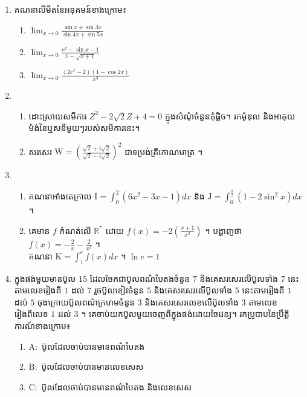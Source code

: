 \documentclass{officialexam}
\begin{document}
	{\maketitle}
	\begin{enumerate}[I]
		\item គណនាលីមីតនៃអនុគមន៍ខាងក្រោម៖
		\begin{enumerate}[k,3]
			\item $\lim_{x\to0}\frac{\sin x+\sin3x}{\sin4x+\sin5x}$
			\item $\lim_{x\to0}\frac{e^x-\sin x-1}{1-\sqrt{x+1}}$
			\item $\lim_{x\to0}\frac{(2e^x-2)(1-\cos2x)}{x^3}$
		\end{enumerate}
		\item\begin{enumerate}[k]
			\item ដោះស្រាយសមីការ $Z^2-2\sqrt{2}Z+4=0$ ក្នុងសំណុំចំនួនកុំផ្លិច។ រកម៉ូឌុល និងអាគុយម៉ង់នៃឬសនីមួយៗរបស់សមីការនេះ។
			\item សរសេរ $\mathrm{W}=\left(\frac{\sqrt{2}+i\sqrt{2}}{\sqrt{2}-i\sqrt{2}}\right)^2$ ជាទម្រង់ត្រីកោណមាត្រ ។
		\end{enumerate}
		\item \begin{enumerate}[k]
			\item គណនាអាំងតេក្រាល $\mathrm{I}=\int_0^2\left(6x^2-3x-1\right)dx$ និង $\mathrm{J}=\int_{0}^{\frac{\pi}{2}}\left(1-2\sin^2x\right)dx$ ។
			\item គេមាន $f$ កំណត់លើ $\mathbb{R^*}$ ដោយ $f(x)=-2\left(\frac{x+1}{x^2}\right)$ ។ បង្ហាញថា $f(x)=-\frac{2}{x}-\frac{2}{x^2}$ ។\\
			គណនា $\mathrm{K}=\int_{1}^{e}f(x)dx$ ។ $\ln e=1$
		\end{enumerate}
		\item ក្នុងផង់មួយមានប៊ូល $15$ ដែលចែកជាប៊ូលពណ៌បៃតងចំនួន $7$ និងគេសរសេរលើប៊ូលទាំង $7$ នេះតាមលេខរៀងពី $1$ ដល់ $7$ រួចប៊ូលខៀវចំនួន $5$ និងគេសរសេរលើប៊ូលទាំង $5$ នេះតាមរៀងពី $1$ ដល់ $5$ ចុងក្រោយប៊ូលពណ៌ក្រហមចំនួន $3$ និងគេសរសេរលេខលើប៊ូលទាំង $3$ តាមលេខរៀងពីលេខ $1$ ដល់ $3$ ។ គេចាប់យកប៊ូលមួយចេញពីក្នុងផង់ដោយចៃដន្យ។ រកប្រូបាបនៃប្រឹត្តិការណ៍ខាងក្រោម៖ 
		\begin{enumerate}[k]
			\item $\mathrm{A}:$ ប៊ូលដែលចាប់បានមានពណ៌បៃតង
			\item $\mathrm{B}:$ ប៊ូលដែលចាប់បានមានលេខសេស
			\item $\mathrm{C}:$ ប៊ូលដែលចាប់បានមានពណ៌បៃតង និងលេខសេស
		\end{enumerate}

\end{enumerate}
\end{document}
